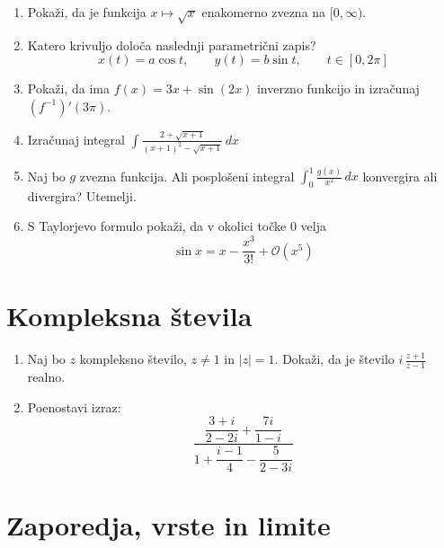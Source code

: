 \documentclass[a4paper,12pt]{article}
\begin{document}
\begin{enumerate}
\item
Pokaži, da je funkcija \( x \mapsto \sqrt{x}\) enakomerno zvezna na \([0,\infty)\).

\item
Katero krivuljo določa naslednji parametrični zapis?
\[
x(t) = a \cos t, \qquad %
y(t) = b \sin t, \qquad %
t \in [0, 2 \pi]
\]

\item
Pokaži, da ima \(f(x)= 3x + \sin(2x)\) inverzno funkcijo in izračunaj \((f^{-1})'(3\pi)\).

\item
Izračunaj integral
\(\displaystyle \int \frac{2+\sqrt{x+1}}{(x+1)^2-\sqrt{x+1}}\,dx\)

\item
Naj bo \(g\) zvezna funkcija. Ali posplošeni integral
\(\int _0^1 \frac{g(x)}{x^2}\,dx\)
konvergira ali divergira? Utemelji.

\item
S Taylorjevo formulo pokaži, da v okolici točke \(0\) velja
\[\sin x = x - \frac{x^3}{3!}+\mathcal{O}(x^5)\]
\end{enumerate}

\section*{Kompleksna števila}

\begin{enumerate}
\item
Naj bo \(z\) kompleksno število, \(z \ne 1\) in \(|z|=1\).
Dokaži, da je število \( i \, \frac{z+1}{z-1} \) realno.

\item
Poenostavi izraz:
\[\frac{\dfrac{3+i}{2-2i}+\dfrac{7i}{1-i}}{1+\dfrac{i-1}{4}-\dfrac{5}{2-3i}}\]
\end{enumerate}

\section*{Zaporedja, vrste in limite}
\end{document}
